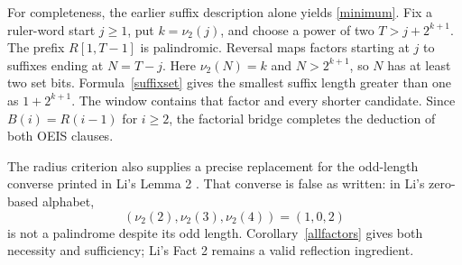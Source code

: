 \documentclass[11pt]{article}
\newcommand{\vv}{\nu_2}
\begin{document}
For completeness, the earlier suffix description alone yields
\eqref{minimum}. Fix a ruler-word start $j\ge1$, put $k=\vv(j)$,
and choose a power of two $T>j+2^{k+1}$. The prefix $R[1,T-1]$ is
palindromic. Reversal maps factors starting at $j$ to suffixes ending
at $N=T-j$. Here $\vv(N)=k$ and $N>2^{k+1}$, so $N$ has at least
two set bits. Formula~\eqref{suffixset} gives the smallest suffix length
greater than one as $1+2^{k+1}$. The window contains that factor and
every shorter candidate. Since $B(i)=R(i-1)$ for $i\ge2$, the
factorial bridge completes the deduction of both OEIS clauses.

The radius criterion also supplies a precise replacement for the
odd-length converse printed in Li's Lemma 2 \cite{li}. That converse
is false as written: in Li's zero-based alphabet,
\[
 (\vv(2),\vv(3),\vv(4))=(1,0,2)
\]
is not a palindrome despite its odd length.
Corollary~\ref{allfactors} gives both necessity and
sufficiency; Li's Fact 2 remains a valid reflection ingredient.
\end{document}
